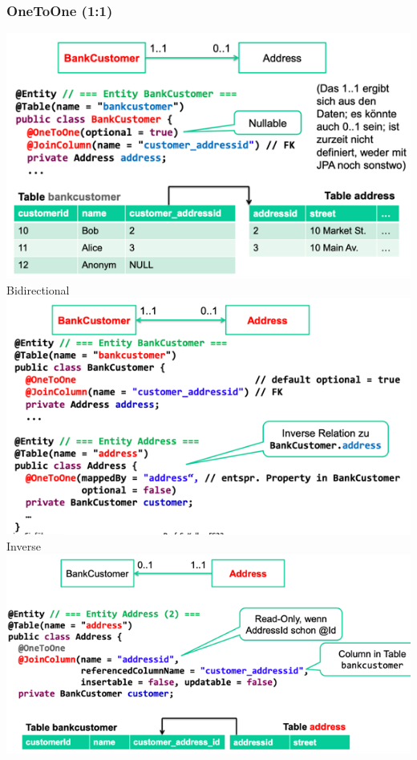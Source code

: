 \documentclass[a4paper, landscape, 8pt]{scrartcl}
\begin{document}
\begin{multicols*}{4}
        \subsubsection{OneToOne (1:1)}
        \includegraphics[width=\columnwidth]{graphic/02-one-to-one}
        Bidirectional\\
        \includegraphics[width=\columnwidth]{graphic/03-bidirectional-one-to-one}
        Inverse\\
        \includegraphics[width=\columnwidth]{graphic/04-inverse-one-to-one}


\end{multicols*}
\end{document}
